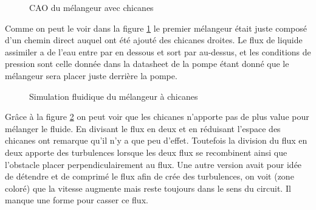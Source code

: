 \documentclass[a4paper, 11pt]{article}
\begin{document}
\begin{figure}[H]
    \centering
    \caption{CAO du mélangeur avec chicanes}
    \label{fig:CAO_prototype_melangeur}
\end{figure}
Comme on peut le voir dans la figure \ref{fig:CAO_prototype_melangeur} le premier mélangeur était 
juste composé d'un chemin direct auquel ont été ajouté des chicanes droites.
Le flux de liquide assimiler a de l'eau entre par en dessous et sort par au-dessus, 
et les conditions de pression sont celle donnée dans la datasheet de la pompe étant donné 
que le mélangeur sera placer juste derrière la pompe.
\begin{figure}[H]
    \centering
    \caption{Simulation fluidique du mélangeur à chicanes}
    \label{fig:simulation2}
\end{figure}
Grâce à la figure \ref{fig:simulation2} on peut voir que les chicanes n'apporte pas
 de plus value pour mélanger le fluide.
En divisant le flux en deux et en réduisant l'espace des chicanes ont remarque qu'il
 n'y a que peu d'effet.
Toutefois la division du flux en deux apporte des turbulences lorsque les deux flux
 se recombinent ainsi que l'obstacle placer perpendiculairement au flux.
Une autre version avait pour idée de détendre et de comprimé le flux afin de crée des
 turbulences, on voit (zone coloré) que la vitesse augmente mais reste toujours dans
  le sens du circuit.
Il manque une forme pour casser ce flux.
\end{document}
